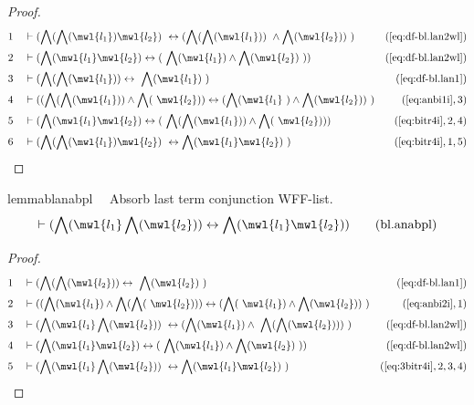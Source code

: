 \begin{proof}
\begin{align}
  1 &&  & \vdash ( \bigwedge( \bigwedge( \mwl{l_1} ) \mwl{l_2} )
     ~\leftrightarrow ( \bigwedge( \bigwedge( \mwl{l_1} ) )
     ~\wedge \bigwedge( \mwl{l_2} ) )
     ~)&(\mbox{\ref{eq:df-bl.lan2wl}})\notag
  \\ 2 &&  & \vdash ( \bigwedge( \mwl{l_1} \mwl{l_2} ) \leftrightarrow (
     ~\bigwedge( \mwl{l_1} ) \wedge \bigwedge( \mwl{l_2} )
     ~) )&(\mbox{\ref{eq:df-bl.lan2wl}})\notag
  \\ 3 &&  & \vdash ( \bigwedge( \bigwedge( \mwl{l_1} ) ) \leftrightarrow
     ~\bigwedge( \mwl{l_1} )
     ~)&(\mbox{\ref{eq:df-bl.lan1}})\notag
  \\ 4 &&  & \vdash ( ( \bigwedge( \bigwedge( \mwl{l_1} ) ) \wedge \bigwedge(
     ~\mwl{l_2} ) ) \leftrightarrow ( \bigwedge( \mwl{l_1}
     ~) \wedge \bigwedge( \mwl{l_2} ) )
     ~)&(\mbox{\ref{eq:anbi1i}},3)\notag
  \\ 5 &&  & \vdash ( \bigwedge( \mwl{l_1} \mwl{l_2} ) \leftrightarrow (
     ~\bigwedge( \bigwedge( \mwl{l_1} ) ) \wedge \bigwedge(
     ~\mwl{l_2} ) ) )&(\mbox{\ref{eq:bitr4i}},2,4)\notag
  \\ 6 &&  & \vdash ( \bigwedge( \bigwedge( \mwl{l_1} ) \mwl{l_2} )
     ~\leftrightarrow \bigwedge( \mwl{l_1} \mwl{l_2} )
     ~)&(\mbox{\ref{eq:bitr4i}},1,5)\notag
\end{align}
\end{proof}

\begin{restatable}{lemma}{blanabpl}~~ Absorb last term conjunction WFF-list.
\begin{align}
\vdash ( \bigwedge( \mwl{l_1} \bigwedge( \mwl{l_2} ) ) \leftrightarrow
    \bigwedge( \mwl{l_1} \mwl{l_2} ) )\label{eq:bl.anabpl}\tag{bl.anabpl}
\end{align}
\end{restatable}

\begin{proof}
\begin{align}
  1 &&  & \vdash ( \bigwedge( \bigwedge( \mwl{l_2} ) ) \leftrightarrow
     ~\bigwedge( \mwl{l_2} )
     ~)&(\mbox{\ref{eq:df-bl.lan1}})\notag
  \\ 2 &&  & \vdash ( ( \bigwedge( \mwl{l_1} ) \wedge \bigwedge( \bigwedge(
     ~\mwl{l_2} ) ) ) \leftrightarrow ( \bigwedge(
     ~\mwl{l_1} ) \wedge \bigwedge( \mwl{l_2} ) )
     ~)&(\mbox{\ref{eq:anbi2i}},1)\notag
  \\ 3 &&  & \vdash ( \bigwedge( \mwl{l_1} \bigwedge( \mwl{l_2} ) )
     ~\leftrightarrow ( \bigwedge( \mwl{l_1} ) \wedge
     ~\bigwedge( \bigwedge( \mwl{l_2} ) ) )
     ~)&(\mbox{\ref{eq:df-bl.lan2wl}})\notag
  \\ 4 &&  & \vdash ( \bigwedge( \mwl{l_1} \mwl{l_2} ) \leftrightarrow (
     ~\bigwedge( \mwl{l_1} ) \wedge \bigwedge( \mwl{l_2} )
     ~) )&(\mbox{\ref{eq:df-bl.lan2wl}})\notag
  \\ 5 &&  & \vdash ( \bigwedge( \mwl{l_1} \bigwedge( \mwl{l_2} ) )
     ~\leftrightarrow \bigwedge( \mwl{l_1} \mwl{l_2} )
     ~)&(\mbox{\ref{eq:3bitr4i}},2,3,4)\notag
\end{align}
\end{proof}

